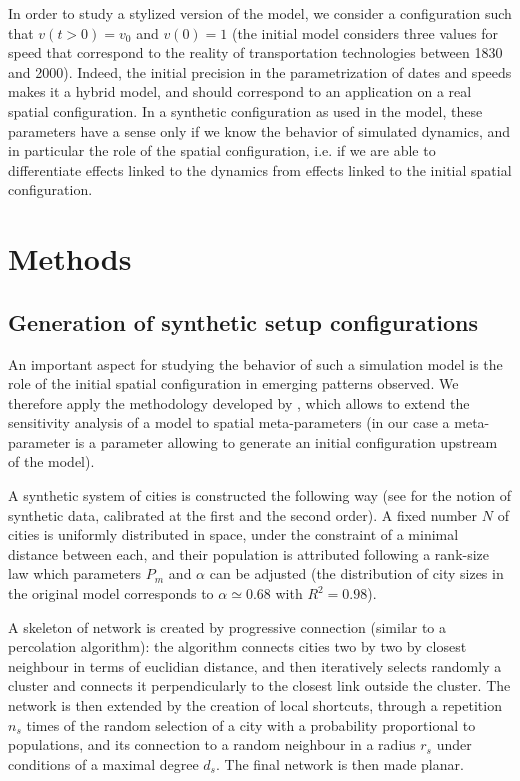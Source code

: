 \documentclass[graybox]{svmult}
\begin{document}
In order to study a stylized version of the model, we consider a configuration such that $v(t > 0) = v_0$ and $v(0) = 1$ (the initial model considers three values for speed that correspond to the reality of transportation technologies between 1830 and 2000). Indeed, the initial precision in the parametrization of dates and speeds makes it a hybrid model, and should correspond to an application on a real spatial configuration. In a synthetic configuration as used in the model, these parameters have a sense only if we know the behavior of simulated dynamics, and in particular the role of the spatial configuration, i.e. if we are able to differentiate effects linked to the dynamics from effects linked to the initial spatial configuration.



\section{Methods}

\subsection{Generation of synthetic setup configurations}


An important aspect for studying the behavior of such a simulation model is the role of the initial spatial configuration in emerging patterns observed. We therefore apply the methodology developed by \cite{cottineau2017initial}, which allows to extend the sensitivity analysis of a model to spatial meta-parameters (in our case a meta-parameter is a parameter allowing to generate an initial configuration upstream of the model).


A synthetic system of cities is constructed the following way (see \cite{raimbault2016generation} for the notion of synthetic data, calibrated at the first and the second order). A fixed number $N$ of cities is uniformly distributed in space, under the constraint of a minimal distance between each, and their population is attributed following a rank-size law which parameters $P_{m}$ and $\alpha$ can be adjusted (the distribution of city sizes in the original model corresponds to $\alpha\simeq 0.68$ with $R^2=0.98$).

A skeleton of network is created by progressive connection (similar to a percolation algorithm): the algorithm connects cities two by two by closest neighbour in terms of euclidian distance, and then iteratively selects randomly a cluster and connects it perpendicularly to the closest link outside the cluster. The network is then extended by the creation of local shortcuts, through a repetition $n_s$ times of the random selection of a city with a probability proportional to populations, and its connection to a random neighbour in a radius $r_s$ under conditions of a maximal degree $d_s$. The final network is then made planar.
\end{document}
